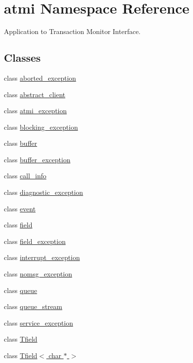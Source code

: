 \hypertarget{namespaceatmi}{\section{atmi Namespace Reference}
\label{namespaceatmi}
}


Application to Transaction Monitor Interface.  


\subsection*{Classes}
\begin{DoxyCompactItemize}
\item 
class \hyperlink{classatmi_1_1aborted__exception}{aborted\+\_\+exception}
\item 
class \hyperlink{classatmi_1_1abstract__client}{abstract\+\_\+client}
\item 
class \hyperlink{classatmi_1_1atmi__exception}{atmi\+\_\+exception}
\item 
class \hyperlink{classatmi_1_1blocking__exception}{blocking\+\_\+exception}
\item 
class \hyperlink{classatmi_1_1buffer}{buffer}
\item 
class \hyperlink{classatmi_1_1buffer__exception}{buffer\+\_\+exception}
\item 
class \hyperlink{classatmi_1_1call__info}{call\+\_\+info}
\item 
class \hyperlink{classatmi_1_1diagnostic__exception}{diagnostic\+\_\+exception}
\item 
class \hyperlink{classatmi_1_1event}{event}
\item 
class \hyperlink{classatmi_1_1field}{field}
\item 
class \hyperlink{classatmi_1_1field__exception}{field\+\_\+exception}
\item 
class \hyperlink{classatmi_1_1interrupt__exception}{interrupt\+\_\+exception}
\item 
class \hyperlink{classatmi_1_1nomsg__exception}{nomsg\+\_\+exception}
\item 
class \hyperlink{classatmi_1_1queue}{queue}
\item 
class \hyperlink{classatmi_1_1queue__stream}{queue\+\_\+stream}
\item 
class \hyperlink{classatmi_1_1service__exception}{service\+\_\+exception}
\item 
class \hyperlink{classatmi_1_1_tfield}{Tfield}
\item 
class \hyperlink{classatmi_1_1_tfield_3_01char_01_5_01_4}{Tfield$<$ char $\ast$ $>$}

\end{DoxyCompactItemize}
